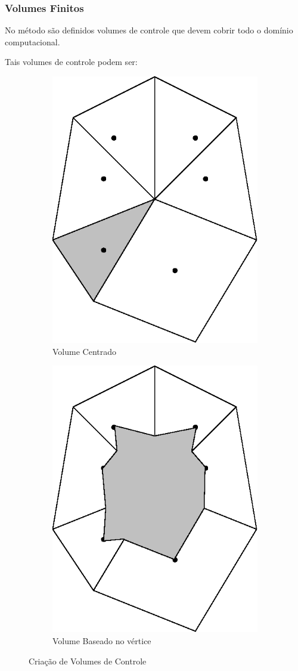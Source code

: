 \documentclass[brazil]{beamer}
\begin{document}
\begin{frame}
  \frametitle{Volumes Finitos}

  No método são definidos volumes de controle que devem cobrir todo o domínio computacional.

  Tais volumes de controle podem ser:

  \begin{figure}[ht]
    \begin{subfigure}{.4\textwidth}
        \centering
        \includegraphics[width=.4\linewidth]{fig/volume_centrado.eps}
        \caption{Volume Centrado}
        \label{fig:volume_centrado}        
    \end{subfigure}
    \begin{subfigure}{.4\textwidth}
        \centering
        \includegraphics[width=.4\linewidth]{fig/volume_vertice.eps}
        \caption[]{Volume Baseado no vértice}
        \label{fig:volume_vertice}        
    \end{subfigure}

    \caption{Criação de Volumes de Controle}
    \label{fig:volume-controle}
  \end{figure}

\end{frame}
\end{document}
